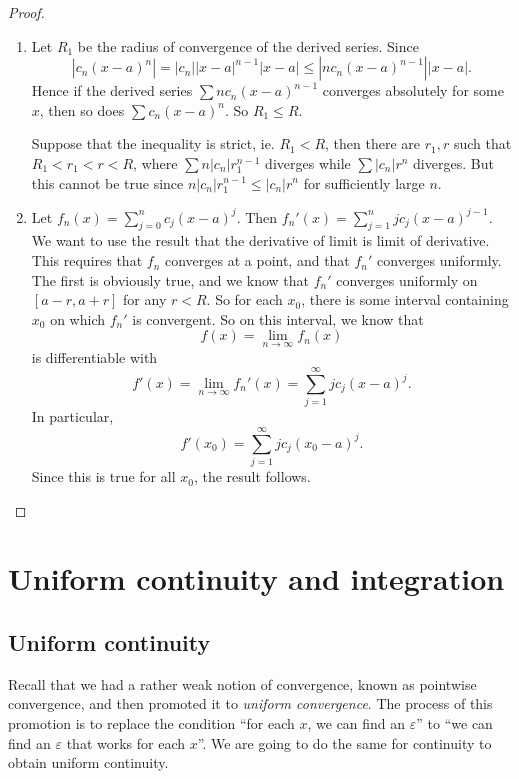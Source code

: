 \documentclass[a4paper]{article}
\begin{document}
\begin{proof}\leavevmode
  \begin{enumerate}
    \item Let $R_1$ be the radius of convergence of the derived series. Since
      \[
        |c_n(x - a)^n| = |c_n||x - a|^{n - 1}|x - a| \leq |n c_n (x - a)^{n - 1}| |x - a|.
      \]
      Hence if the derived series $\sum n c_n(x - a)^{n - 1}$ converges absolutely for some $x$, then so does $\sum c_n (x - a)^n$. So $R_1 \leq R$.

      Suppose that the inequality is strict, ie. $R_1 < R$, then there are $r_1, r$ such that $R_1 < r_1 < r < R$, where $\sum n|c_n| r_1^{n - 1}$ diverges while $\sum |c_n| r^n$ diverges. But this cannot be true since $n|c_n| r_1^{n - 1} \leq |c_n| r^n$ for sufficiently large $n$.

    \item Let $f_n(x) = \sum\limits_{j = 0}^n c_j (x - a)^j$. Then $f_n '(x) = \sum\limits_{j = 1}^n j c_j (x - a)^{j - 1}$. We want to use the result that the derivative of limit is limit of derivative. This requires that $f_n$ converges at a point, and that $f_n'$ converges uniformly. The first is obviously true, and we know that $f_n'$ converges uniformly on $[a - r, a + r]$ for any $r < R$. So for each $x_0$, there is some interval containing $x_0$ on which $f_n'$ is convergent. So on this interval, we know that
      \[
        f(x) = \lim_{n \to \infty}f_n (x)
      \]
      is differentiable with
      \[
        f'(x) = \lim_{n \to \infty}f_n'(x) = \sum_{j = 1}^\infty jc_j (x - a)^j.
      \]
      In particular,
      \[
        f'(x_0) = \sum_{j = 1}^\infty jc_j (x_0 - a)^j.
      \]
      Since this is true for all $x_0$, the result follows.
  \end{enumerate}
\end{proof}

\section{Uniform continuity and integration}
\subsection{Uniform continuity}
Recall that we had a rather weak notion of convergence, known as pointwise convergence, and then promoted it to \emph{uniform convergence}. The process of this promotion is to replace the condition ``for each $x$, we can find an $\varepsilon$'' to ``we can find an $\varepsilon$ that works for each $x$''. We are going to do the same for continuity to obtain uniform continuity.
\end{document}
